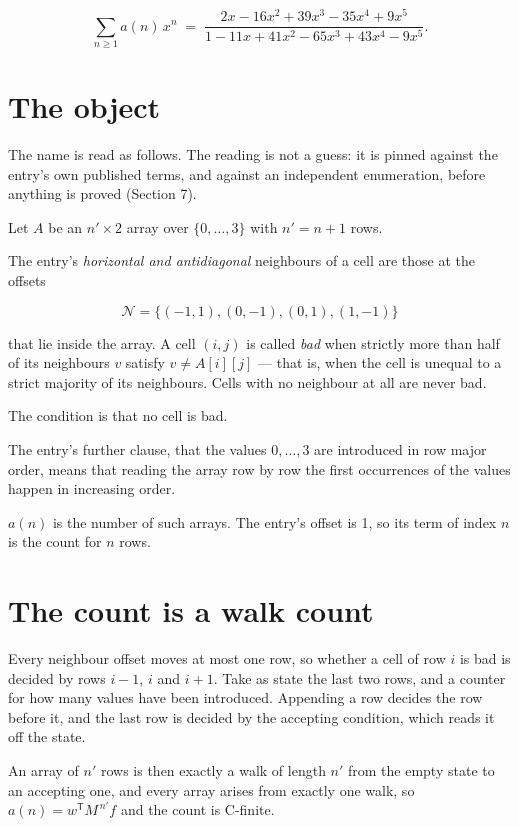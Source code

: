 \documentclass[11pt]{article}
\theoremstyle{definition}
\begin{document}
\[\sum_{n \ge 1} a(n)\,x^n \;=\; \frac{2x - 16x^{2} + 39x^{3} - 35x^{4} + 9x^{5}}{1 - 11x + 41x^{2} - 65x^{3} + 43x^{4} - 9x^{5}}.\]

\section{The object}

The name is read as follows. The reading is not a guess: it is pinned against the entry's own published terms, and against an independent enumeration, before anything is proved (Section 7).

Let $A$ be an $n' \times 2$ array over $\{0,\dots,3\}$ with $n' = n + 1$ rows.

The entry's {\itshape horizontal and antidiagonal} neighbours of a cell are those at the offsets

\[\mathcal{N} = \{(-1,1), (0,-1), (0,1), (1,-1)\}\]

that lie inside the array. A cell $(i,j)$ is called {\itshape bad} when strictly more than half of its neighbours $v$ satisfy $v \ne A[i][j]$ --- that is, when the cell is unequal to a strict majority of its neighbours. Cells with no neighbour at all are never bad.

The condition is that no cell is bad.

The entry's further clause, that the values $0,\dots,3$ are introduced in row major order, means that reading the array row by row the first occurrences of the values happen in increasing order.

$a(n)$ is the number of such arrays. The entry's offset is 1, so its term of index $n$ is the count for $n$ rows.

\section{The count is a walk count}

Every neighbour offset moves at most one row, so whether a cell of row $i$ is bad is decided by rows $i-1$, $i$ and $i+1$. Take as state the last two rows, and a counter for how many values have been introduced. Appending a row decides the row before it, and the last row is decided by the accepting condition, which reads it off the state.

An array of $n'$ rows is then exactly a walk of length $n'$ from the empty state to an accepting one, and every array arises from exactly one walk, so $a(n) = w^{\mathsf T}M^{\,n'}f$ and the count is C-finite.
\end{document}
